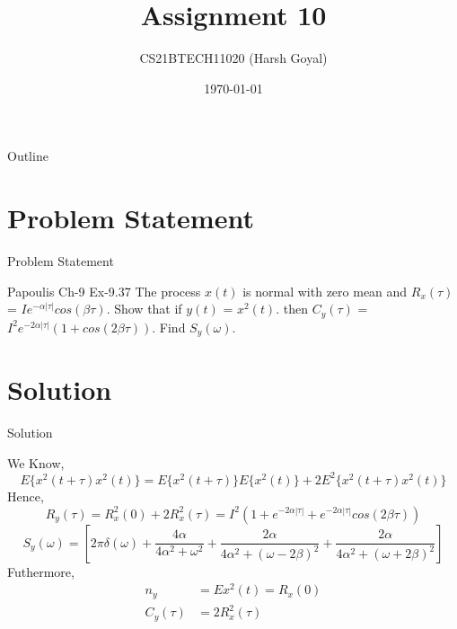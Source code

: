 \documentclass{beamer}
\title{Assignment 10}
\author{CS21BTECH11020 (Harsh Goyal)}
\date{\today}
\begin{document}
\begin{frame}
    \titlepage 
\end{frame}

\logo{}


\begin{frame}{Outline}
    \tableofcontents
\end{frame}


\section{Problem Statement}
\begin{frame}{Problem Statement}
\begin{block}{Papoulis Ch-9 Ex-9.37 }
The process $x(t)$ is normal with zero mean and $R_x(\tau)$ = $Ie^{-\alpha |\tau|}cos(\beta \tau)$. Show that if $y(t)$ =
$x^2(t)$. then $C_y(\tau)$ = $I^2e^{-2 \alpha |\tau|}(1 + cos(2\beta\tau))$. Find $S_y(\omega)$.
    
\end{block}

\end{frame}


\section{Solution}
\begin{frame}{Solution}
 \begin{block}{}
 We Know,
 \begin{equation}
     E\{x^2(t+\tau)x^2(t)\} = E\{x^2(t+\tau)\}E\{x^2(t)\} + 2E^2\{x^2(t+\tau)x^2(t)\}
 \end{equation}
 Hence,
 \begin{equation}
     R_y(\tau) = R_x^2(0)+2R_x^2(\tau) = I^2(1+e^{-2\alpha |\tau|}+e^{-2\alpha |\tau|}cos(2\beta \tau))
 \end{equation}
 \begin{equation}
     S_y(\omega) = \left[ 2\pi\delta(\omega) + \frac{4\alpha}{4\alpha^2+\omega^2}+\frac{2\alpha}{4\alpha^2+(\omega-2\beta)^2}+ \frac{2\alpha}{4\alpha^2+(\omega+2\beta)^2} \right]
 \end{equation}
 Futhermore,
 \begin{align}
     n_y&= E{x^2(t)} = R_x(0) \\ C_y(\tau)&= 2R_x^2(\tau)
 \end{align}
 \end{block}
\end{frame} 
\end{document}

